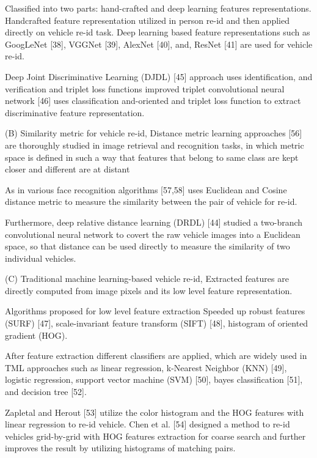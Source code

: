 	Classified into two parts: hand-crafted and deep learning features representations. Handcrafted feature representation utilized in person
	re-id and then applied directly on vehicle re-id task. Deep learning based feature representations such as GoogLeNet [38], VGGNet [39], AlexNet [40], and,
ResNet [41] are used for vehicle re-id.
	
	Deep Joint Discriminative Learning (DJDL) [45] approach uses identification, and verification and
 triplet loss functions improved triplet convolutional neural network [46] uses classification and-oriented and triplet loss function to extract discriminative feature representation.
	
	
(B) Similarity metric for vehicle re-id,
	Distance metric learning approaches [56]
are thoroughly studied in image retrieval and recognition tasks, in which metric space is
	defined in such a way that features that belong to same class are kept closer and different are at distant
	
	As in various face recognition algorithms [57,58] uses Euclidean and
	Cosine distance metric to measure the similarity between the pair of vehicle for re-id.
	
	Furthermore,
deep relative distance learning (DRDL) [44] studied a two-branch convolutional neural
network to covert the raw vehicle images into a Euclidean space, so that distance can be
used directly to measure the similarity of two individual vehicles.
	

(C) Traditional machine learning-based vehicle re-id, 
	Extracted features are directly computed from image pixels and its low level feature representation.
	
	Algorithms proposed for low level feature extraction
		Speeded up robust features (SURF) [47],
		scale-invariant feature transform (SIFT) [48], 
		histogram of oriented gradient (HOG).
		
	After feature extraction different classifiers are applied, which are widely used in TML
approaches such as linear regression, k-Nearest Neighbor (KNN) [49], logistic regression,
support vector machine (SVM) [50], bayes classification [51], and decision tree [52]. 
	
	Zapletal and
Herout [53] utilize the color histogram and the HOG features with linear regression to
re-id vehicle. 
	Chen et al. [54] designed a method to re-id vehicles grid-by-grid with HOG
features extraction for coarse search and further improves the result by utilizing histograms
of matching pairs.
	

